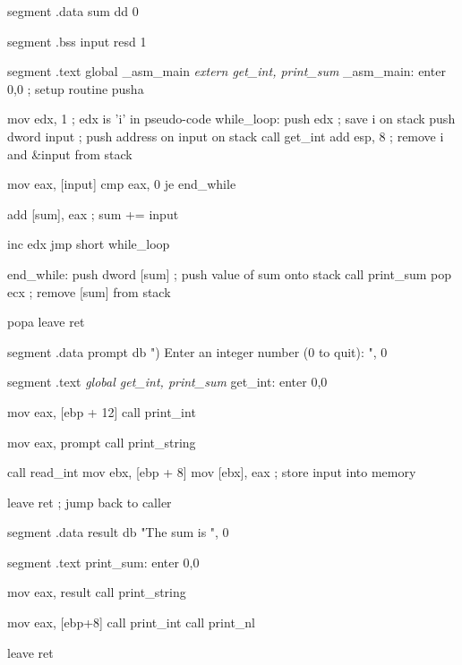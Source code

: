 \begin{AsmCodeListing}[label=main4.asm,commandchars=\\\{\}]

segment .data
sum     dd   0

segment .bss
input   resd 1

segment .text
        global  _asm_main
\textit{        extern  get_int, print_sum}
_asm_main:
        enter   0,0               ; setup routine
        pusha

        mov     edx, 1            ; edx is 'i' in pseudo-code
while_loop:
        push    edx               ; save i on stack
        push    dword input       ; push address on input on stack
        call    get_int
        add     esp, 8            ; remove i and &input from stack

        mov     eax, [input]
        cmp     eax, 0
        je      end_while

        add     [sum], eax        ; sum += input

        inc     edx
        jmp     short while_loop

end_while:
        push    dword [sum]       ; push value of sum onto stack
        call    print_sum
        pop     ecx               ; remove [sum] from stack

        popa
        leave                     
        ret
\end{AsmCodeListing}

\begin{AsmCodeListing}[label=sub4.asm,commandchars=\\\{\}]

segment .data
prompt  db      ") Enter an integer number (0 to quit): ", 0

segment .text
\textit{        global  get_int, print_sum}
get_int:
        enter   0,0

        mov     eax, [ebp + 12]
        call    print_int

        mov     eax, prompt
        call    print_string
        
        call    read_int
        mov     ebx, [ebp + 8]
        mov     [ebx], eax         ; store input into memory

        leave
        ret                        ; jump back to caller

segment .data
result  db      "The sum is ", 0

segment .text
print_sum:
        enter   0,0

        mov     eax, result
        call    print_string

        mov     eax, [ebp+8]
        call    print_int
        call    print_nl

        leave
        ret
\end{AsmCodeListing}

